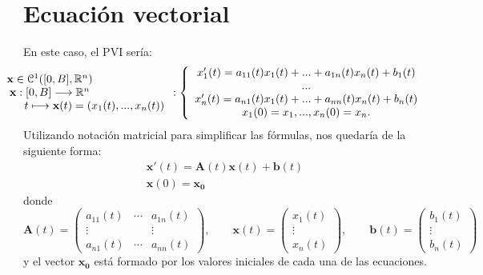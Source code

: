 \section{Ecuación vectorial}
En este caso, el PVI sería:
\begin{equation}\label{eq:vect}
 \hspace*{-3cm} 	\begin{array}{c} \textbf{x} \in \mathcal{C}^1([0,B],\R^n) \\ \textbf{x}:[0,B] \longrightarrow \R^n \\ \qquad \qquad \qquad \qquad t \longmapsto \textbf{x}(t) = (x_1(t),...,x_n(t)) \end{array}:\left\lbrace\begin{array}{c} x_1'(t) = a_{11}(t)x_1(t)+...+a_{1n}(t)x_n(t)+b_1(t) \\ ... \\ x_n'(t) = a_{n1}(t)x_1(t)+...+a_{nn}(t)x_n(t)+b_n(t) \\ x_1(0) = x_1,...,x_n(0) =x_n. \end{array}\right.
\end{equation}
Utilizando notación matricial para simplificar las fórmulas, nos quedaría de la siguiente forma:
\begin{equation}
	\begin{array}{c}
		\textbf{x}'(t) = \textbf{A}(t)\textbf{x}(t)+\textbf{b}(t) \\ \textbf{x}(0) = \textbf{x}_\textbf{0}
	\end{array}
\end{equation}
donde
\begin{equation}
	\textbf{A}(t) = \begin{pmatrix}
		a_{11}(t) & \cdots & a_{1n}(t)\\ 
		\vdots & & \vdots \\
		a_{n1}(t) & \cdots & a_{nn}(t)
	\end{pmatrix}, \qquad \textbf{x}(t) = \begin{pmatrix}
	x_1(t) \\ \vdots \\ x_n(t)
	\end{pmatrix}, \qquad \textbf{b}(t) = \begin{pmatrix}
	b_1(t) \\ \vdots \\ b_n(t)
	\end{pmatrix}
\end{equation}
y el vector $\textbf{x}_\textbf{0}$ está formado por los valores iniciales de cada una de las ecuaciones.

